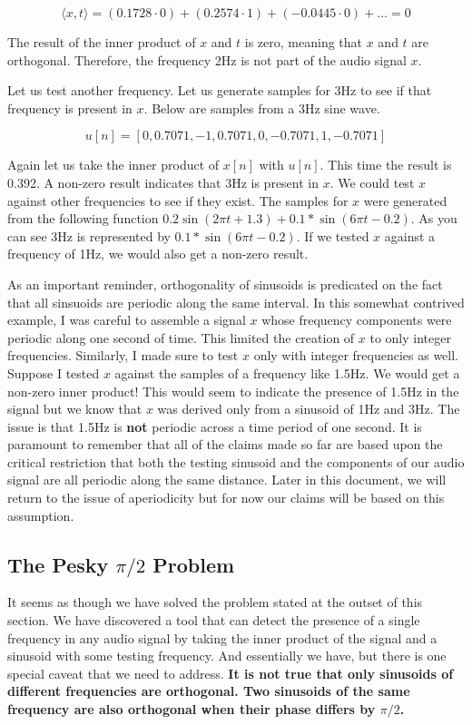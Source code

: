 $$\langle x, t \rangle = (0.1728 \cdot 0) + (0.2574 \cdot 1) + (-0.0445 \cdot 0) + ... = 0$$

\noindent The result of the inner product of $x$ and $t$ is zero, meaning that $x$ and $t$ are orthogonal.  Therefore,
the frequency 2Hz is not part of the audio signal $x$.  

Let us test another frequency.  Let us generate samples for 3Hz to see if that frequency is present in $x$.  
Below are samples from a 3Hz sine wave.

$$u[n] = [0, 0.7071, -1, 0.7071, 0, -0.7071, 1, -0.7071]$$

\noindent Again let us take the inner product of $x[n]$ with $u[n]$.  This time the result is 0.392.  A non-zero
result indicates that 3Hz is present in $x$.  We could test $x$ against other frequencies to see if they exist.  
The samples for $x$ were generated from the following function $0.2\sin(2\pi t + 1.3) + 0.1 * \sin(6\pi t -0.2)$.
As you can see 3Hz is represented by $0.1 * \sin(6\pi t -0.2)$.  If we tested $x$ against a frequency of 1Hz, we
would also get a non-zero result.

As an important reminder, orthogonality of sinusoids is predicated on the fact that all sinsuoids are periodic
along the same interval.  In this somewhat contrived example, I was careful to assemble a signal $x$ whose
frequency components were periodic along one second of time.  This limited the creation of $x$ to only
integer frequencies.  Similarly, I made sure to test $x$ only with integer frequencies as well.  Suppose I tested
$x$ against the samples of a frequency like 1.5Hz.  We would get a non-zero inner product!  This would seem
to indicate the presence of 1.5Hz in the signal but we know that $x$ was derived only from a sinusoid of 1Hz
and 3Hz.  The issue is that 1.5Hz is \textbf{not} periodic across a time period of one second.  It is paramount
to remember that all of the claims made so far are based upon the critical restriction that both the testing sinusoid
and the components of our audio signal are all periodic along the same distance.  Later in this document,
we will return to the issue of aperiodicity but for now our claims will be based on this assumption.

\subsection*{The Pesky $\pi/2$ Problem}

It seems as though we have solved the problem stated at the outset of this section.  We have discovered a tool
that can detect the presence of a single frequency in any audio signal by taking the inner product of the signal
and a sinusoid with some testing frequency.  And essentially we have, but there is one special caveat that
we need to address.  \textbf{It is not true that only sinusoids of different frequencies are orthogonal.  Two sinusoids of the same frequency are also orthogonal when their phase differs by $\pi/2$.}  

